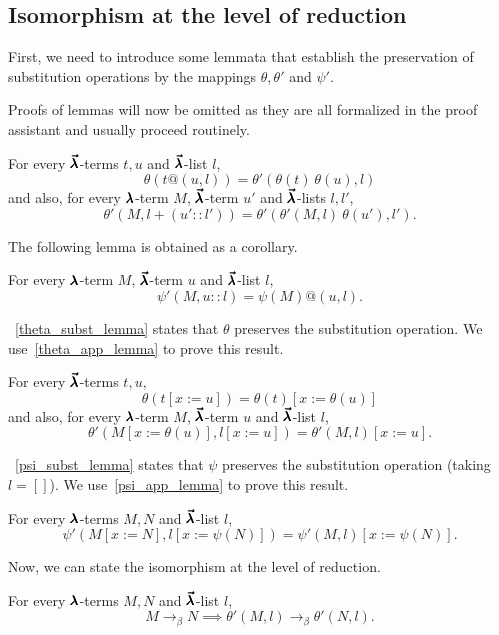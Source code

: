 \subsection{Isomorphism at the level of reduction}

First, we need to introduce some lemmata that establish the preservation of substitution operations by the mappings $\theta, \theta'$ and $\psi'$.

Proofs of lemmas will now be omitted as they are all formalized in the proof assistant and usually proceed routinely.

\begin{lemma}
  \label{theta_app_lemma}
  For every $\pmb{\vec \lambda}$-terms $t, u$ and $\pmb{\vec \lambda}$-list $l$,
  \[ \theta(t@(u, l)) = \theta'(\theta(t) \ \theta(u), l) \]
  and also, for every $\pmb{\lambda}$-term $M$, $\pmb{\vec \lambda}$-term $u'$ and $\pmb{\vec \lambda}$-lists $l, l'$,
  \[ \theta'(M, l+(u'::l')) = \theta'(\theta'(M, l) \ \theta(u'), l'). \]
\end{lemma}

The following lemma is obtained as a corollary.

\begin{lemma}
  \label{psi_app_lemma}
  For every $\pmb{\lambda}$-term $M$, $\pmb{\vec \lambda}$-term $u$ and $\pmb{\vec \lambda}$-list $l$,
  \[ \psi'(M, u :: l) = \psi(M)@(u, l). \]
\end{lemma}

~\cref{theta_subst_lemma} states that $\theta$ preserves the substitution operation.
We use~\cref{theta_app_lemma} to prove this result.

\begin{lemma}
  \label{theta_subst_lemma}
  For every $\pmb{\vec \lambda}$-terms $t, u$,
  \[ \theta(t[x := u]) = \theta(t)[x := \theta(u)] \]
  and also, for every $\pmb{\lambda}$-term $M$,  $\pmb{\vec \lambda}$-term $u$ and $\pmb{\vec \lambda}$-list $l$,
  \[ \theta'(M[x := \theta(u)], l[x := u]) = \theta'(M, l)[x := u]. \]
\end{lemma}

~\cref{psi_subst_lemma} states that $\psi$ preserves the substitution operation (taking $l = []$).
We use~\cref{psi_app_lemma} to prove this result.

\begin{lemma}
  \label{psi_subst_lemma}
  For every $\pmb{\lambda}$-terms $M, N$ and $\pmb{\vec \lambda}$-list $l$,
  \[ \psi'(M[x := N], l[x := \psi(N)]) = \psi'(M, l)[x := \psi(N)]. \]
\end{lemma}

Now, we can state the isomorphism at the level of reduction.

\begin{lemma}
  \label{theta_step_lemma}
  For every $\pmb{\lambda}$-terms $M, N$ and $\pmb{\vec \lambda}$-list $l$,
  \[ M \to_{\beta} N \implies \theta'(M, l) \to_{\beta} \theta'(N, l). \]
\end{lemma}

